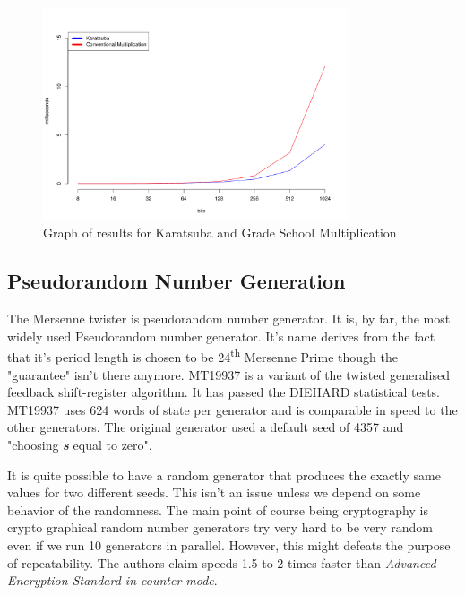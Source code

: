 \documentclass[12pt,journal,compsoc]{IEEEtran}
\begin{document}
\begin{figure}[ht!]
\centering
\includegraphics[width=90mm]{images/karatsubaVSgradeSchool.pdf}
\caption{Graph of results for Karatsuba and Grade School Multiplication}
\label{fig:karatsubaVSgrade}
\end{figure}


\subsection{{Pseudorandom Number Generation}}
\label{sec:mersenne}
The Mersenne twister\cite{MT19937} is pseudorandom number generator. It is, by far, the most widely used Pseudorandom number generator. It's name derives from the fact that it's period length is chosen to be 24\textsuperscript{th} Mersenne Prime though the "guarantee" isn't there anymore. MT19937 is a variant of the twisted generalised feedback shift-register algorithm. It has passed the DIEHARD statistical tests. MT19937 uses 624 words of state per generator and is comparable in speed to the other generators. The original generator used a default seed of 4357 and "choosing \emph{{\bf s}} equal to zero".\cite{MT19937}

 It is quite possible to have a random generator that produces the exactly same values for two different seeds. This isn't an issue unless we depend on some behavior of the randomness. The main point of course being cryptography is crypto graphical random number generators try very hard to be very random even if we run 10 generators in parallel. However, this might defeats the purpose of repeatability. The authors claim speeds 1.5 to 2 times faster than \emph{Advanced Encryption Standard in counter mode}\cite{1347044}.
\end{document}
